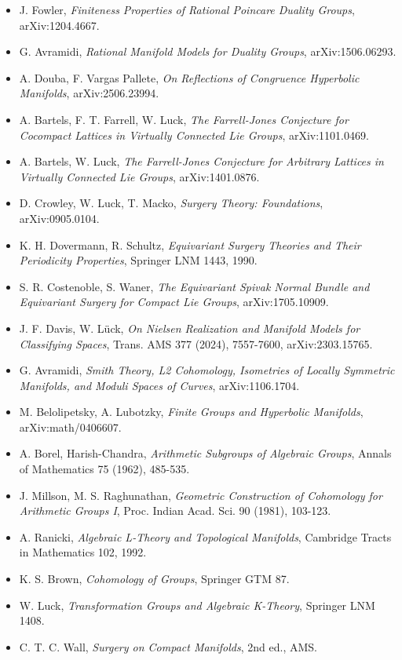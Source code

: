 \begin{itemize}
\tightlist
\item
  J. Fowler, \emph{Finiteness Properties of Rational Poincare Duality Groups},
  arXiv:1204.4667.
\item
  G. Avramidi, \emph{Rational Manifold Models for Duality Groups},
  arXiv:1506.06293.
\item
  A. Douba, F. Vargas Pallete, \emph{On Reflections of Congruence Hyperbolic
  Manifolds}, arXiv:2506.23994.
\item
  A. Bartels, F. T. Farrell, W. Luck, \emph{The Farrell-Jones Conjecture for
  Cocompact Lattices in Virtually Connected Lie Groups}, arXiv:1101.0469.
\item
  A. Bartels, W. Luck, \emph{The Farrell-Jones Conjecture for Arbitrary
  Lattices in Virtually Connected Lie Groups}, arXiv:1401.0876.
\item
  D. Crowley, W. Luck, T. Macko, \emph{Surgery Theory: Foundations},
  arXiv:0905.0104.
\item
  K. H. Dovermann, R. Schultz, \emph{Equivariant Surgery Theories and Their
  Periodicity Properties}, Springer LNM 1443, 1990.
\item
  S. R. Costenoble, S. Waner, \emph{The Equivariant Spivak Normal Bundle and
  Equivariant Surgery for Compact Lie Groups}, arXiv:1705.10909.
\item
  J. F. Davis, W. Lück, \emph{On Nielsen Realization and Manifold Models for
  Classifying Spaces}, Trans. AMS 377 (2024), 7557-7600, arXiv:2303.15765.
\item
  G. Avramidi, \emph{Smith Theory, L2 Cohomology, Isometries of Locally Symmetric
  Manifolds, and Moduli Spaces of Curves}, arXiv:1106.1704.
\item
  M. Belolipetsky, A. Lubotzky, \emph{Finite Groups and Hyperbolic Manifolds},
  arXiv:math/0406607.
\item
  A. Borel, Harish-Chandra, \emph{Arithmetic Subgroups of Algebraic Groups},
  Annals of Mathematics 75 (1962), 485-535.
\item
  J. Millson, M. S. Raghunathan, \emph{Geometric Construction of Cohomology for
  Arithmetic Groups I}, Proc. Indian Acad. Sci. 90 (1981), 103-123.
\item
  A. Ranicki, \emph{Algebraic L-Theory and Topological Manifolds}, Cambridge
  Tracts in Mathematics 102, 1992.
\item
  K. S. Brown, \emph{Cohomology of Groups}, Springer GTM 87.
\item
  W. Luck, \emph{Transformation Groups and Algebraic K-Theory}, Springer LNM
  1408.
\item
  C. T. C. Wall, \emph{Surgery on Compact Manifolds}, 2nd ed., AMS.
\end{itemize}
